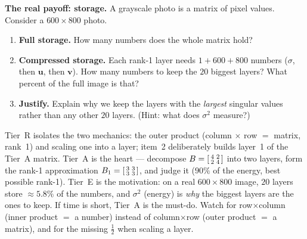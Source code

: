 \documentclass[10pt]{article}
\newcommand{\uu}{\mathbf{u}}
\newcommand{\vv}{\mathbf{v}}
\begin{document}
\begin{tcolorbox}[colback=white, colframe=black!40, title=\textbf{Tier E --- Extension},
    fonttitle=\bfseries, arc=1.5mm, left=3mm, right=3mm, top=2mm, bottom=2mm, breakable]
\textbf{The real payoff: storage.} A grayscale photo is a matrix of pixel values. Consider a
$600\times800$ photo.
\begin{enumerate}[leftmargin=1.7em, itemsep=9pt]
  \item \textbf{Full storage.} How many numbers does the whole matrix hold? 
  \item \textbf{Compressed storage.} Each rank-1 layer needs $1+600+800$ numbers ($\sigma$, then $\uu$, then $\vv$). How many numbers to keep the $20$ biggest layers? What percent of the full image is that?
  \item \textbf{Justify.} Explain why we keep the layers with the \emph{largest} singular values rather than any other $20$ layers. (Hint: what does $\sigma^2$ measure?)
\end{enumerate}
\end{tcolorbox}

\begin{teachernote}
Tier~R isolates the two mechanics: the outer product (column $\times$ row $=$ matrix, rank~1) and scaling
one into a layer; item~2 deliberately builds layer~1 of the Tier~A matrix. Tier~A is the heart --- decompose
$B=\begin{bsmallmatrix} 4 & 2\\ 2 & 4 \end{bsmallmatrix}$ into two layers, form the rank-1 approximation
$B_1=\begin{bsmallmatrix} 3 & 3\\ 3 & 3 \end{bsmallmatrix}$, and judge it ($90\%$ of the energy, best
possible rank-1). Tier~E is the motivation: on a real $600\times800$ image, $20$ layers store $\approx5.8\%$
of the numbers, and $\sigma^2$ (energy) is \emph{why} the biggest layers are the ones to keep. If time is
short, Tier~A is the must-do. Watch for row$\times$column (inner product $=$ a number) instead of
column$\times$row (outer product $=$ a matrix), and for the missing $\tfrac12$ when scaling a layer.
\end{teachernote}
\end{document}
